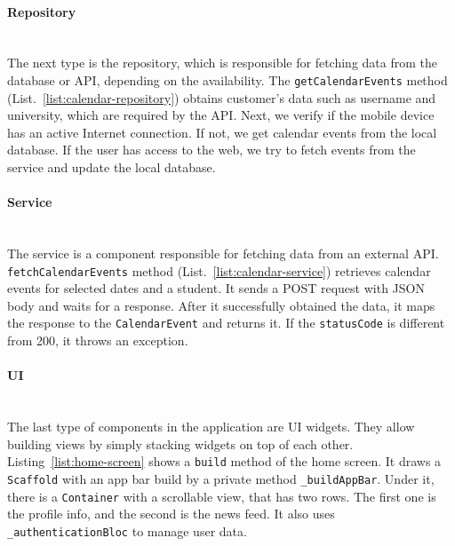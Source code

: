 


\paragraph{\large{Repository}}\mbox{}\\[2pt]
The next type is the repository, which is responsible for fetching data from the database or API, depending on the availability. The \texttt{getCalendarEvents} method (List.~\ref{list:calendar-repository}) obtains customer's data such as username and university, which are required by the API. Next, we verify if the mobile device has an active Internet connection. If not, we get calendar events from the local database. If the user has access to the web, we try to fetch events from the service and update the local database.




\paragraph{\large{Service}}\mbox{}\\[2pt]
The service is a component responsible for fetching data from an external API. \texttt{fetchCalendarEvents} method (List.~\ref{list:calendar-service}) retrieves calendar events for selected dates and a student. It sends a POST request with JSON body and waits for a response. After it successfully obtained the data, it maps the response to the \texttt{CalendarEvent} and returns it. If the \texttt{statusCode} is different from 200, it throws an exception.




\paragraph{\large{UI}}\mbox{}\\[2pt]
The last type of components in the application are UI widgets. They allow building views by simply stacking widgets on top of each other. Listing~\ref{list:home-screen} shows a \texttt{build} method of the home screen. It draws a \texttt{Scaffold} with an app bar build by a private method \texttt{\_buildAppBar}. Under it, there is a \texttt{Container} with a scrollable view, that has two rows. The first one is the profile info, and the second is the news feed. It also uses \texttt{\_authenticationBloc} to manage user data.

